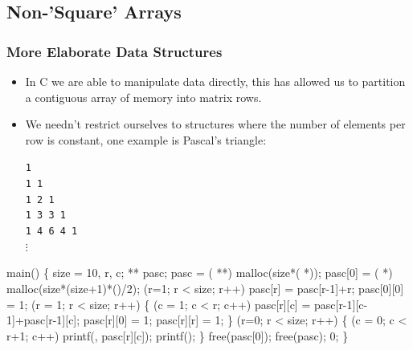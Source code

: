 \documentclass[smaller,handout,table]{beamer}
\begin{document}
\subsection{Non-'Square' Arrays}
\begin{frame}
\frametitle{More Elaborate Data Structures}
\begin{itemize}
\item In C we are able to manipulate data directly, this has allowed us to partition a contiguous array of memory into matrix rows.
\item We needn't restrict ourselves to structures where the number of elements per row is constant, one example is Pascal's triangle:\\
\begin{center}
\tt1\\\tt1 1\\\tt1  2  1\\\tt1  3  3  1\\\tt1  4  6  4  1\\$\vdots$
\end{center}
\end{itemize}
\end{frame}

\begin{frame}[fragile]
\begin{semiverbatim}
\scriptsize
\kr\kl{} main()
\kl\{
\kl   {} size = 10, r, c;
\kl   {} ** pasc;
\kl   pasc = ( **) malloc(size*( *));
\kl   pasc[0] = ( *) malloc(size*(size+1)*()/2);
\kl   {}
\kl   {} (r=1; r < size; r++) pasc[r] = pasc[r-1]+r;
\kl   pasc[0][0] = 1;
\kl   {} (r = 1; r < size; r++)
\kl   \{
\kl      {} (c = 1; c < r; c++)
\kl         pasc[r][c] = pasc[r-1][c-1]+pasc[r-1][c];
\kl      pasc[r][0] = 1; pasc[r][r] = 1;
\kl   \}
\kl   {} (r=0; r < size; r++)
\kl   \{
\kl      {} (c = 0; c < r+1; c++)
\kl         printf(, pasc[r][c]);
\kl      printf();
\kl   \}
\kl   free(pasc[0]);
\kl   free(pasc);
\kl   {} 0;
\kl\}
\end{semiverbatim}
\end{frame}
\end{document}
